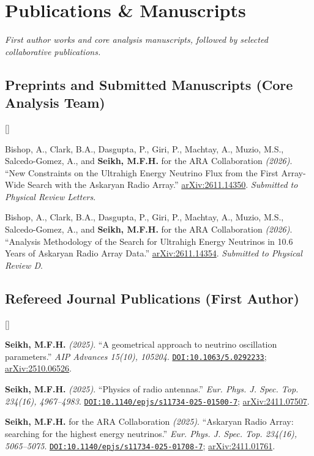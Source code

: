 \documentclass[10pt,letterpaper]{report}
\newcommand{\cvdate}[1]{{\normalfont\itshape\color{Muted}(#1)}}
\newcounter{cvitemrank}
\newenvironment{cvnumbered}[1]{%
  \setcounter{cvitemrank}{#1}%
  \begin{list}{\textcolor{Muted}{[\arabic{cvitemrank}]}}{%
    \setlength{\leftmargin}{2.25em}\setlength{\labelwidth}{1.65em}
    \setlength{\labelsep}{0.45em}\setlength{\itemindent}{0pt}
    \setlength{\itemsep}{0.3pt}\setlength{\topsep}{1.5pt}
    \setlength{\parsep}{0pt}\setlength{\partopsep}{0pt}}%
}{\end{list}}
\newcommand{\cvnumitem}{\item\addtocounter{cvitemrank}{-1}}
\newenvironment{cvpubnumbered}[1]{\begin{cvnumbered}{#1}\setlength{\itemsep}{2.2pt}\setlength{\topsep}{3pt}}{\end{cvnumbered}}
\newcommand{\doi}[1]{{\urlstyle{tt}\href{https://doi.org/#1}{\nolinkurl{DOI:#1}}}}
\newcommand{\arxiv}[1]{\href{https://arxiv.org/abs/#1}{arXiv:#1}}
\begin{document}
\begingroup
\fontsize{10}{12.0}\selectfont
\renewcommand{\cvdate}[1]{{\normalfont\itshape(#1)}}
\section*{Publications \& Manuscripts}
\noindent\textit{First author works and core analysis manuscripts, followed by selected collaborative publications.}



\subsection*{Preprints and Submitted Manuscripts (Core Analysis Team)}
\begin{cvpubnumbered}{2}
    \cvnumitem Bishop, A., Clark, B.A., Dasgupta, P., Giri, P., Machtay, A., Muzio, M.S., Salcedo-Gomez, A., and \textbf{Seikh, M.F.H.} for the ARA Collaboration \cvdate{2026}. ``New Constraints on the Ultrahigh Energy Neutrino Flux from the First Array-Wide Search with the Askaryan Radio Array.'' \arxiv{2611.14350}. \textit{Submitted to Physical Review Letters}.

    \cvnumitem Bishop, A., Clark, B.A., Dasgupta, P., Giri, P., Machtay, A., Muzio, M.S., Salcedo-Gomez, A., and \textbf{Seikh, M.F.H.} for the ARA Collaboration \cvdate{2026}. ``Analysis Methodology of the Search for Ultrahigh Energy Neutrinos in 10.6 Years of Askaryan Radio Array Data.'' \arxiv{2611.14354}. \textit{Submitted to Physical Review D}.
\end{cvpubnumbered}



\subsection*{Refereed Journal Publications (First Author)}
\begin{cvpubnumbered}{3}
    \cvnumitem \textbf{Seikh, M.F.H.} \cvdate{2025}. ``A geometrical approach to neutrino oscillation parameters.'' \textit{AIP Advances 15(10), 105204}. \doi{10.1063/5.0292233}; \arxiv{2510.06526}.
    \cvnumitem \textbf{Seikh, M.F.H.} \cvdate{2025}. ``Physics of radio antennas.'' \textit{Eur. Phys. J. Spec. Top. 234(16), 4967--4983}. \doi{10.1140/epjs/s11734-025-01500-7}; \arxiv{2411.07507}.
    \cvnumitem \textbf{Seikh, M.F.H.} for the ARA Collaboration \cvdate{2025}. ``Askaryan Radio Array: searching for the highest energy neutrinos.'' \textit{Eur. Phys. J. Spec. Top. 234(16), 5065--5075}. \doi{10.1140/epjs/s11734-025-01708-7}; \arxiv{2411.01761}.
\end{cvpubnumbered}
\end{document}
